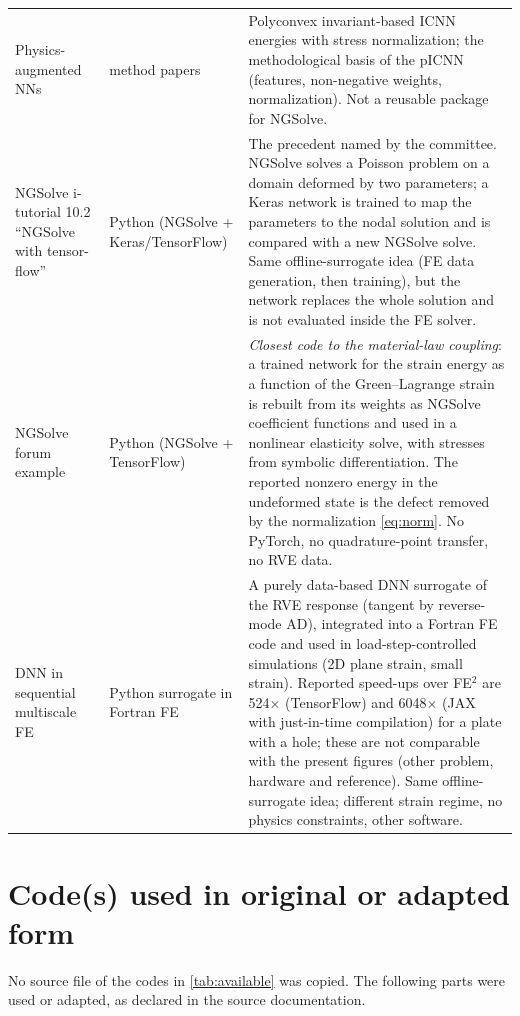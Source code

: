 {\begin{xltabular}{\textwidth}{@{}p{3.1cm}p{1.9cm}X@{}}
Physics-augmented NNs~\cite{Klein2022,Linden2023,Kalina2022} & method papers &
  Polyconvex invariant-based ICNN energies with stress normalization; the
  methodological basis of the pICNN (features, non-negative weights,
  normalization). Not a reusable package for NGSolve.\\
NGSolve i-tutorial 10.2 ``NGSolve with tensor-flow''~\cite{NGSolveTF} & Python (NGSolve + Keras/TensorFlow) &
  The precedent named by the committee. NGSolve solves a Poisson problem on a
  domain deformed by two parameters; a Keras network is trained to map the
  parameters to the nodal solution and is compared with a new NGSolve solve. Same
  offline-surrogate idea (FE data generation, then training), but the network
  replaces the whole solution and is not evaluated inside the FE solver.\\
NGSolve forum example~\cite{NGSolveForumTF} & Python (NGSolve + TensorFlow) &
  \emph{Closest code to the material-law coupling}: a trained network for the
  strain energy as a function of the Green--Lagrange strain is rebuilt from its
  weights as NGSolve coefficient functions and used in a nonlinear elasticity
  solve, with stresses from symbolic differentiation. The reported nonzero energy
  in the undeformed state is the defect removed by the normalization
  \cref{eq:norm}. No PyTorch, no quadrature-point transfer, no RVE data.\\
DNN in sequential multiscale FE~\cite{Troeger2023} & Python surrogate in Fortran FE &
  A purely data-based DNN surrogate of the RVE response (tangent by reverse-mode
  AD), integrated into a Fortran FE code and used in load-step-controlled simulations
  (2D plane strain, small strain). Reported speed-ups over FE$^2$ are 524$\times$
  (TensorFlow) and 6048$\times$ (JAX with just-in-time compilation) for a plate with a hole;
  these are not comparable with the present figures (other problem, hardware and
  reference). Same offline-surrogate idea; different strain regime, no physics
  constraints, other software.\\
\end{xltabular}
}

\section{Code(s) used in original or adapted form}

No source file of the codes in \cref{tab:available} was copied. The following
parts were used or adapted, as declared in the source documentation.

